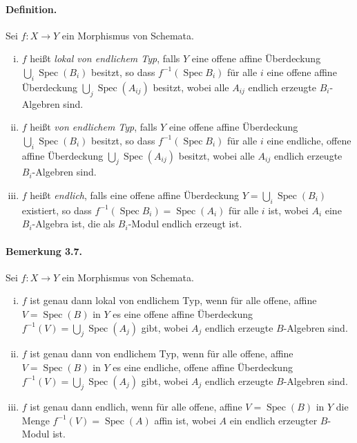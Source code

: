 \documentclass[11pt,b5paper,openany]{memoir}
\begin{document}
\paragraph{Definition.} Sei $f:X\to Y$ ein Morphismus von Schemata.
\begin{enumerate}[(i)]
\item $f$ heißt \textit{lokal von endlichem Typ}, falls $Y$ eine offene affine Überdeckung $\bigcup_i\operatorname{Spec}(B_i)$ besitzt, so dass $f^{-1}(\operatorname{Spec}B_i)$ für alle $i$ eine offene affine Überdeckung $\bigcup_j\operatorname{Spec}(A_{ij})$ besitzt, wobei alle $A_{ij}$ endlich erzeugte $B_i$-Algebren sind.
\item $f$ heißt \textit{von endlichem Typ}, falls $Y$ eine offene affine Überdeckung $\bigcup_i\operatorname{Spec}(B_i)$ besitzt, so dass $f^{-1}(\operatorname{Spec}B_i)$ für alle $i$ eine endliche, offene affine Überdeckung $\bigcup_j\operatorname{Spec}(A_{ij})$ besitzt, wobei alle $A_{ij}$ endlich erzeugte $B_i$-Algebren sind.
\item $f$ heißt \textit{endlich}, falls eine offene affine Überdeckung $Y=\bigcup_i\operatorname{Spec}(B_i)$ existiert, so dass $f^{-1}(\operatorname{Spec}B_i)=\operatorname{Spec}(A_i)$ für alle $i$ ist, wobei $A_i$ eine $B_i$-Algebra ist, die als $B_i$-Modul endlich erzeugt ist.
\end{enumerate}

\paragraph{Bemerkung 3.7.}\label{3.7} Sei $f:X\to Y$ ein Morphismus von Schemata.
\begin{enumerate}[(i)]
\item $f$ ist genau dann lokal von endlichem Typ, wenn für alle offene, affine $V=\operatorname{Spec}(B)$ in $Y$ es eine offene affine Überdeckung $f^{-1}(V)=\bigcup_j\operatorname{Spec}(A_j)$ gibt, wobei $A_j$ endlich erzeugte $B$-Algebren sind.
\item $f$ ist genau dann von endlichem Typ, wenn für alle offene, affine $V=\operatorname{Spec}(B)$ in $Y$ es eine endliche, offene affine Überdeckung $f^{-1}(V)=\bigcup_j\operatorname{Spec}(A_j)$ gibt, wobei $A_j$ endlich erzeugte $B$-Algebren sind.
\item $f$ ist genau dann endlich, wenn für alle offene, affine $V=\operatorname{Spec}(B)$ in $Y$ die Menge $f^{-1}(V)=\operatorname{Spec}(A)$ affin ist, wobei $A$ ein endlich erzeugter $B$-Modul ist.
\end{enumerate}
\end{document}
